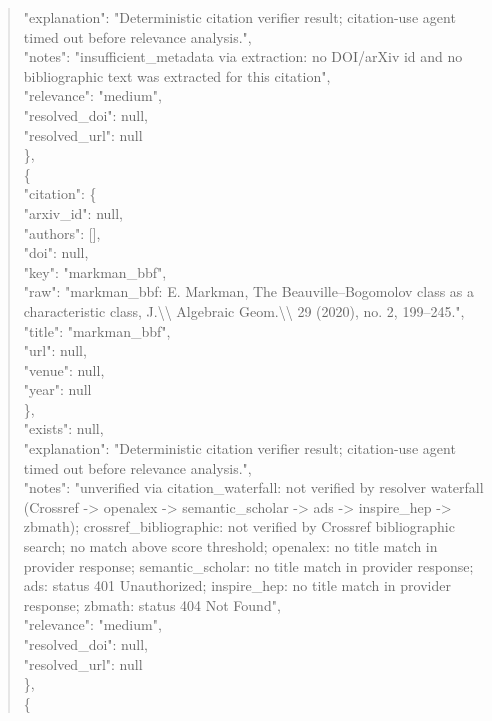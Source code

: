 \documentclass[11pt]{article}
\begin{document}
\begin{quote}
      "explanation": "Deterministic citation verifier result; citation-use agent timed out before relevance analysis.",\\
      "notes": "insufficient\_metadata via extraction: no DOI/arXiv id and no bibliographic text was extracted for this citation",\\
      "relevance": "medium",\\
      "resolved\_doi": null,\\
      "resolved\_url": null\\
    \},\\
    \{\\
      "citation": \{\\
        "arxiv\_id": null,\\
        "authors": [],\\
        "doi": null,\\
        "key": "markman\_bbf",\\
        "raw": "markman\_bbf: E. Markman, The Beauville--Bogomolov class as a characteristic class, J.\textbackslash{}\textbackslash{} Algebraic Geom.\textbackslash{}\textbackslash{} 29 (2020), no. 2, 199--245.",\\
        "title": "markman\_bbf",\\
        "url": null,\\
        "venue": null,\\
        "year": null\\
      \},\\
      "exists": null,\\
      "explanation": "Deterministic citation verifier result; citation-use agent timed out before relevance analysis.",\\
      "notes": "unverified via citation\_waterfall: not verified by resolver waterfall (Crossref -> openalex -> semantic\_scholar -> ads -> inspire\_hep -> zbmath); crossref\_bibliographic: not verified by Crossref bibliographic search; no match above score threshold; openalex: no title match in provider response; semantic\_scholar: no title match in provider response; ads: status 401 Unauthorized; inspire\_hep: no title match in provider response; zbmath: status 404 Not Found",\\
      "relevance": "medium",\\
      "resolved\_doi": null,\\
      "resolved\_url": null\\
    \},\\
    \{\\

\end{quote}
\end{document}
